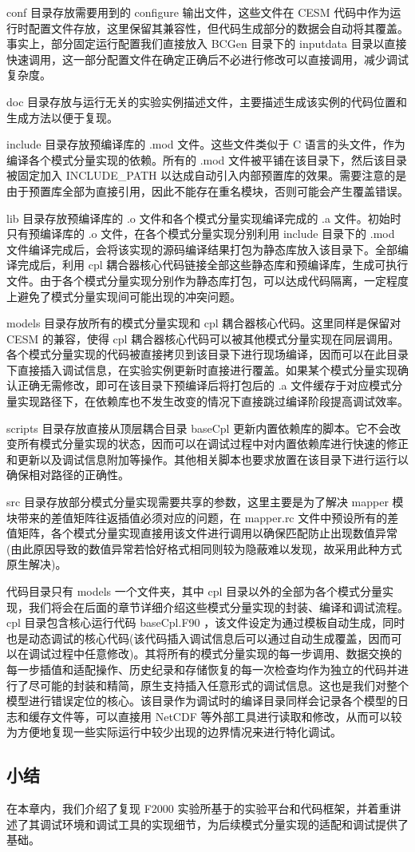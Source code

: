 conf 目录存放需要用到的 configure 输出文件，这些文件在 CESM 代码中作为运行时配置文件存放，这里保留其兼容性，但代码生成部分的数据会自动将其覆盖。事实上，部分固定运行配置我们直接放入 BCGen 目录下的 inputdata 目录以直接快速调用，这一部分配置文件在确定正确后不必进行修改可以直接调用，减少调试复杂度。

doc 目录存放与运行无关的实验实例描述文件，主要描述生成该实例的代码位置和生成方法以便于复现。

include 目录存放预编译库的 .mod 文件。这些文件类似于 C 语言的头文件，作为编译各个模式分量实现的依赖。所有的 .mod 文件被平铺在该目录下，然后该目录被固定加入 INCLUDE\_PATH 以达成自动引入内部预置库的效果。需要注意的是由于预置库全部为直接引用，因此不能存在重名模块，否则可能会产生覆盖错误。

lib 目录存放预编译库的 .o 文件和各个模式分量实现编译完成的 .a 文件。初始时只有预编译库的 .o 文件，在各个模式分量实现分别利用 include 目录下的 .mod 文件编译完成后，会将该实现的源码编译结果打包为静态库放入该目录下。全部编译完成后，利用 cpl 耦合器核心代码链接全部这些静态库和预编译库，生成可执行文件。由于各个模式分量实现分别作为静态库打包，可以达成代码隔离，一定程度上避免了模式分量实现间可能出现的冲突问题。

models 目录存放所有的模式分量实现和 cpl 耦合器核心代码。这里同样是保留对 CESM 的兼容，使得 cpl 耦合器核心代码可以被其他模式分量实现在同层调用。各个模式分量实现的代码被直接拷贝到该目录下进行现场编译，因而可以在此目录下直接插入调试信息，在实验实例更新时直接进行覆盖。如果某个模式分量实现确认正确无需修改，即可在该目录下预编译后将打包后的 .a 文件缓存于对应模式分量实现路径下，在依赖库也不发生改变的情况下直接跳过编译阶段提高调试效率。

scripts 目录存放直接从顶层耦合目录 baseCpl 更新内置依赖库的脚本。它不会改变所有模式分量实现的状态，因而可以在调试过程中对内置依赖库进行快速的修正和更新以及调试信息附加等操作。其他相关脚本也要求放置在该目录下进行运行以确保相对路径的正确性。

src 目录存放部分模式分量实现需要共享的参数，这里主要是为了解决 mapper 模块带来的差值矩阵往返插值必须对应的问题，在 mapper.rc 文件中预设所有的差值矩阵，各个模式分量实现直接用该文件进行调用以确保匹配防止出现数值异常(由此原因导致的数值异常若恰好格式相同则较为隐蔽难以发现，故采用此种方式原生解决)。

代码目录只有 models 一个文件夹，其中 cpl 目录以外的全部为各个模式分量实现，我们将会在后面的章节详细介绍这些模式分量实现的封装、编译和调试流程。 cpl 目录包含核心运行代码 baseCpl.F90 ，该文件设定为通过模板自动生成，同时也是动态调试的核心代码(该代码插入调试信息后可以通过自动生成覆盖，因而可以在调试过程中任意修改)。其将所有的模式分量实现的每一步调用、数据交换的每一步插值和适配操作、历史纪录和存储恢复的每一次检查均作为独立的代码并进行了尽可能的封装和精简，原生支持插入任意形式的调试信息。这也是我们对整个模型进行错误定位的核心。该目录作为调试时的编译目录同样会记录各个模型的日志和缓存文件等，可以直接用 NetCDF 等外部工具进行读取和修改，从而可以较为方便地复现一些实际运行中较少出现的边界情况来进行特化调试。

\subsection{小结}

在本章内，我们介绍了复现 F2000 实验所基于的实验平台和代码框架，并着重讲述了其调试环境和调试工具的实现细节，为后续模式分量实现的适配和调试提供了基础。
